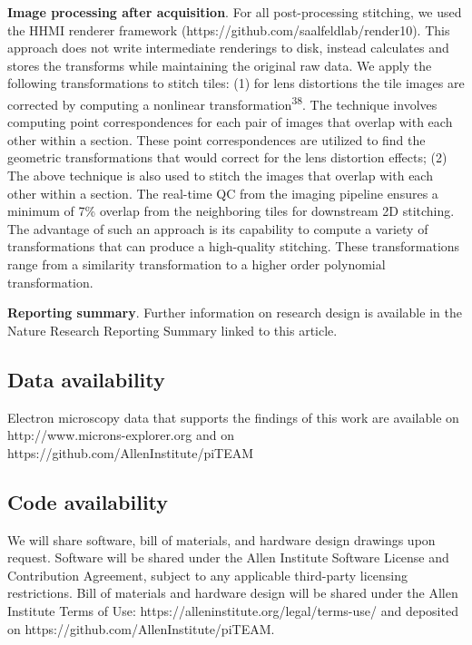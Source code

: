 \documentclass{article}
\begin{document}
{\noindent\textbf{Image processing after acquisition}. For all post-processing stitching, we used the HHMI renderer framework (https://github.com/saalfeldlab/render10). This approach does not write intermediate renderings to disk, instead calculates and stores the transforms while maintaining the original raw data. We apply the following transformations to stitch tiles: (1) for lens distortions the tile images are corrected by computing a nonlinear transformation\textsuperscript{38}. The technique involves computing point correspondences for each pair of images that overlap with each other within a section. These point correspondences are utilized to find the geometric transformations that would correct for the lens distortion effects; (2) The above technique is also used to stitch the images that overlap with each other within a section. The real-time QC from the imaging pipeline ensures a minimum of 7\% overlap from the neighboring tiles for downstream 2D stitching. The advantage of such an approach is its capability to compute a variety of transformations that can produce a high-quality stitching. These transformations range from a similarity transformation to a higher order polynomial transformation.

\noindent\textbf{Reporting summary}. Further information on research design is available in the Nature Research Reporting Summary linked to this article.
}

\subsection*{Data availability}

Electron microscopy data that supports the findings of this work are available on http://www.microns-explorer.org and on https://github.com/AllenInstitute/piTEAM

\subsection*{Code availability}

We will share software, bill of materials, and hardware design drawings upon request. Software will be shared under the Allen Institute Software License and Contribution Agreement, subject to any applicable third-party licensing restrictions. Bill of materials and hardware design will be shared under the Allen Institute Terms of Use: https://alleninstitute.org/legal/terms-use/ and deposited on https://github.com/AllenInstitute/piTEAM.
\end{document}
